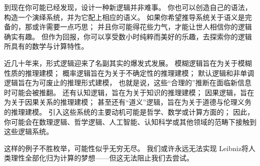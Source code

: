 \documentclass[../../../include/open-logic-section]{subfiles}
\begin{document}


到现在你可能已经发现，设计一种新逻辑并非难事。
你也可以创造自己的语法，构造一个演绎系统，并为它配上相应的语义。
如果你希望推导系统关于语义是完备的，那或许需要一点巧思；
并且你可能得花些力气，才能让世人相信你的逻辑确实有趣。
但作为回报，你可以享受数小时纯粹而美好的乐趣，去探索你的逻辑所具有的数学与计算特性。

近几十年来，形式逻辑迎来了名副其实的爆发式发展。
模糊逻辑旨在为关于模糊性质的推理建模；
概率逻辑旨在为关于不确定性的推理建模；
默认逻辑和非单调逻辑旨在为可废止的推理形式建模，
也就是说，这些“合理的”推断在面临新信息时可能会被推翻。
还有认知逻辑，旨在为关于知识的推理建模；
因果逻辑，旨在为关于因果关系的推理建模；
甚至还有“道义”逻辑，旨在为关于道德与伦理义务的推理建模。
引入这些系统的主要动机可能是哲学、数学或计算方面的；
因此，你可能会在数理逻辑、哲学逻辑、人工智能、认知科学或其他领域的范畴下接触到这些逻辑系统。

这样的例子不胜枚举，可能性似乎无穷无尽。
我们或许永远无法实现 Leibniz将人类理性全部化归为计算的梦想——但这无法阻止我们去尝试。
\end{document}

